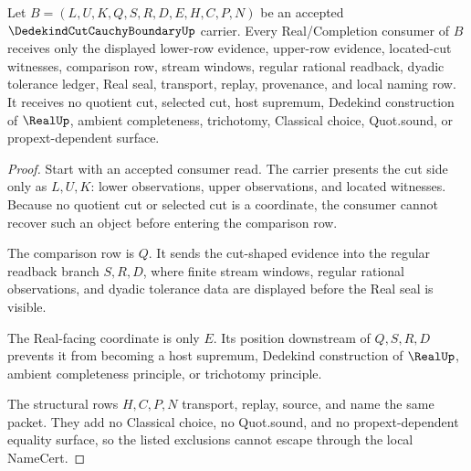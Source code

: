 \begin{theorem}
\label{thm:dedekind-cut-cauchy-boundary-nonescape}
Let $B=(L,U,K,Q,S,R,D,E,H,C,P,N)$ be an accepted $\DedekindCutCauchyBoundaryUp$ carrier. Every Real/Completion consumer of $B$ receives only the displayed lower-row evidence, upper-row evidence, located-cut witnesses, comparison row, stream windows, regular rational readback, dyadic tolerance ledger, Real seal, transport, replay, provenance, and local naming row. It receives no quotient cut, selected cut, host supremum, Dedekind construction of $\RealUp$, ambient completeness, trichotomy, Classical choice, Quot.sound, or propext-dependent surface.
\end{theorem}
\begin{proof}
Start with an accepted consumer read. The carrier presents the cut side only as $L,U,K$: lower observations, upper observations, and located witnesses. Because no quotient cut or selected cut is a coordinate, the consumer cannot recover such an object before entering the comparison row.

The comparison row is $Q$. It sends the cut-shaped evidence into the regular readback branch $S,R,D$, where finite stream windows, regular rational observations, and dyadic tolerance data are displayed before the Real seal is visible.

The Real-facing coordinate is only $E$. Its position downstream of $Q,S,R,D$ prevents it from becoming a host supremum, Dedekind construction of $\RealUp$, ambient completeness principle, or trichotomy principle.

The structural rows $H,C,P,N$ transport, replay, source, and name the same packet. They add no Classical choice, no Quot.sound, and no propext-dependent equality surface, so the listed exclusions cannot escape through the local NameCert.
\end{proof}

